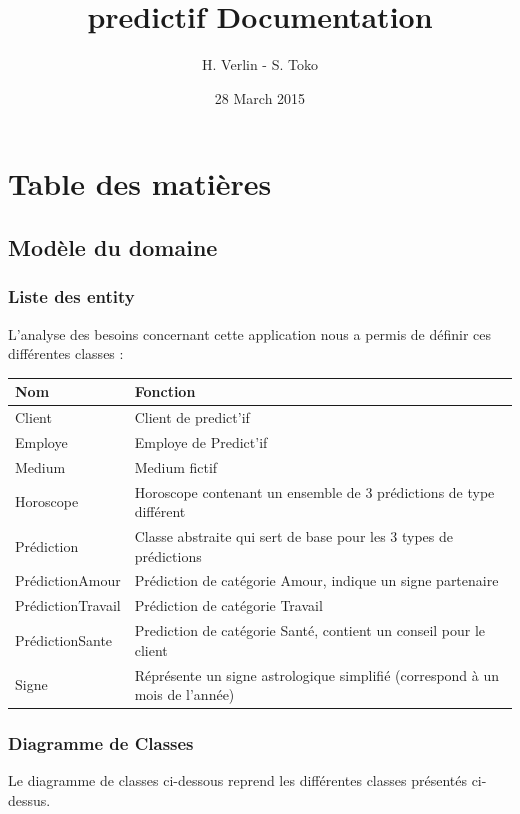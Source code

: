 \documentclass[letterpaper,10pt,french]{sphinxmanual}
\title{predictif Documentation}
\date{28 March 2015}
\author{H. Verlin - S. Toko}
\begin{document}
\maketitle
\tableofcontents
{}\label{index::doc}



\chapter{Table des matières}
\label{index:prefictif-documentation}\label{index:table-des-matieres}

\section{Modèle du domaine}
\label{modele:modele-du-domaine}\label{modele::doc}

\subsection{Liste des entity}
\label{modele:liste-des-entity}
L'analyse des besoins concernant cette application nous a permis de définir ces différentes classes :

\begin{tabulary}{\linewidth}{|L|L|}
\hline
\textsf{\relax 
Nom
} & \textsf{\relax 
Fonction
}\\
\hline
Client
 & 
Client de predict'if
\\
\hline
Employe
 & 
Employe de Predict'if
\\
\hline
Medium
 & 
Medium fictif
\\
\hline
Horoscope
 & 
Horoscope contenant un ensemble de 3 prédictions de type différent
\\
\hline
Prédiction
 & 
Classe abstraite qui sert de base pour les 3 types de prédictions
\\
\hline
PrédictionAmour
 & 
Prédiction de catégorie Amour,
indique un signe partenaire
\\
\hline
PrédictionTravail
 & 
Prédiction de catégorie Travail
\\
\hline
PrédictionSante
 & 
Prediction de catégorie Santé, contient un conseil pour le client
\\
\hline
Signe
 & 
Réprésente un signe astrologique simplifié
(correspond à un mois de l'année)
\\
\hline\end{tabulary}



\subsection{Diagramme de Classes}
\label{modele:diagramme-de-classes}
Le diagramme de classes ci-dessous reprend les différentes classes présentés ci-dessus.
\end{document}
